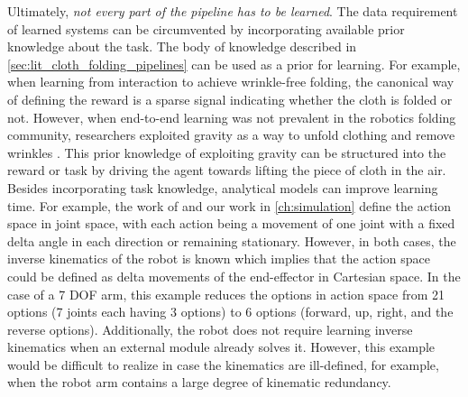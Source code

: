\documentclass[\home/main.tex]{subfiles}
\begin{document}
Ultimately, \emph{not every part of the pipeline has to be learned}.
The data requirement of learned systems can be circumvented by incorporating available prior knowledge about the task. The body of knowledge described in \cref{sec:lit_cloth_folding_pipelines} can be used as a prior for learning. For example, when learning from interaction to achieve wrinkle-free folding, the canonical way of defining the reward is a sparse signal indicating whether the cloth is folded or not. However, when end-to-end learning was not prevalent in the robotics folding community, researchers exploited gravity as a way to unfold clothing and remove wrinkles \autocite{Doumanoglou2016,Maitin2010}. This prior knowledge of exploiting gravity can be structured into the reward or task by driving the agent towards lifting the piece of cloth in the air.
Besides incorporating task knowledge, analytical models can improve learning time. For example, the work of \textcite{Zhang2015} and our work in \cref{ch:simulation} define the action space in joint space, with each action being a movement of one joint with a fixed delta angle in each direction or remaining stationary. However, in both cases, the inverse kinematics of the robot is known which implies that the action space could be defined as delta movements of the end-effector in Cartesian space. In the case of a 7 \gls{DOF} arm, this example reduces the options in action space from 21 options (7 joints each having 3 options) to 6 options (forward, up, right, and the reverse options). Additionally, the robot does not require learning inverse kinematics when an external module already solves it. However, this example would be difficult to realize in case the kinematics are ill-defined, for example, when the robot arm contains a large degree of kinematic redundancy. 
\end{document}
